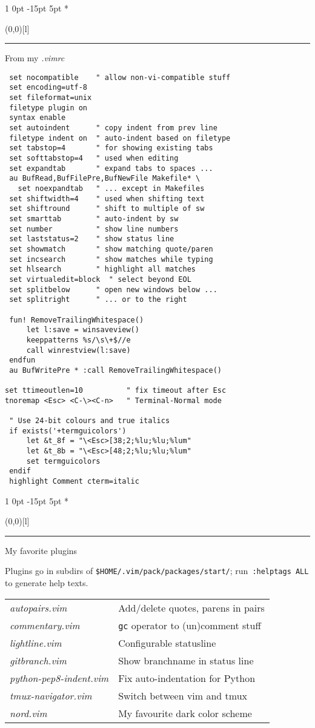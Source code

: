 \documentclass[a4paper, landscape, 10pt]{article}
\makeatletter
\newlength{\shift}
\renewcommand{\section}{%
    \@startsection{section}%
        {1}%
        {0pt}%
        {-15pt}%
        {5pt}%
        {\fontsize{14pt}{12pt}\fontseries{ub}\selectfont\color{accentcolor}}}
\newcommand{\V}[1]{\texttt{\textup{#1}}}
\newcommand{\topic}[1]{\section*{\protect\makebox(0,0)[l]{\color{accentcolor!80}\rule[8pt]{\columnwidth}{19pt}}\hspace{.5em}\color{white}#1}}
\makeatother
\begin{document}
\begin{multicols*}{3}
\topic{From my \textit{.vimrc}}
\begin{verbatim}
 set nocompatible    " allow non-vi-compatible stuff
 set encoding=utf-8
 set fileformat=unix
 filetype plugin on
 syntax enable
 set autoindent      " copy indent from prev line
 filetype indent on  " auto-indent based on filetype
 set tabstop=4       " for showing existing tabs
 set softtabstop=4   " used when editing
 set expandtab       " expand tabs to spaces ...
 au BufRead,BufFilePre,BufNewFile Makefile* \
   set noexpandtab   " ... except in Makefiles
 set shiftwidth=4    " used when shifting text
 set shiftround      " shift to multiple of sw
 set smarttab        " auto-indent by sw
 set number          " show line numbers
 set laststatus=2    " show status line
 set showmatch       " show matching quote/paren
 set incsearch       " show matches while typing
 set hlsearch        " highlight all matches
 set virtualedit=block  " select beyond EOL
 set splitbelow      " open new windows below ...
 set splitright      " ... or to the right

 fun! RemoveTrailingWhitespace()
     let l:save = winsaveview()
     keeppatterns %s/\s\+$//e
     call winrestview(l:save)
 endfun
 au BufWritePre * :call RemoveTrailingWhitespace()

set ttimeoutlen=10          " fix timeout after Esc
tnoremap <Esc> <C-\><C-n>   " Terminal-Normal mode

 " Use 24-bit colours and true italics
 if exists('+termguicolors')
     let &t_8f = "\<Esc>[38;2;%lu;%lu;%lum"
     let &t_8b = "\<Esc>[48;2;%lu;%lu;%lum"
     set termguicolors
 endif
 highlight Comment cterm=italic
\end{verbatim}

\columnbreak



\topic{My favorite plugins}
Plugins go in subdirs of \verb|$HOME/.vim/pack/packages/start/|; run~\V{:helptags ALL} to generate help texts.
\vspace{.5\baselineskip}

    \begin{tabularx}{\columnwidth}{>{\itshape}l>{\raggedright\arraybackslash}X}
autopairs.vim           &Add/delete quotes, parens in pairs\\
commentary.vim          &\V{gc} operator to (un)comment stuff\\
lightline.vim           &Configurable statusline\\
gitbranch.vim           &Show branchname in status line\\
python-pep8-indent.vim  &Fix auto-indentation for Python\\
tmux-navigator.vim      &Switch between vim and tmux\\
nord.vim                &My favourite dark color scheme
    \end{tabularx}


\end{multicols*}
\end{document}

